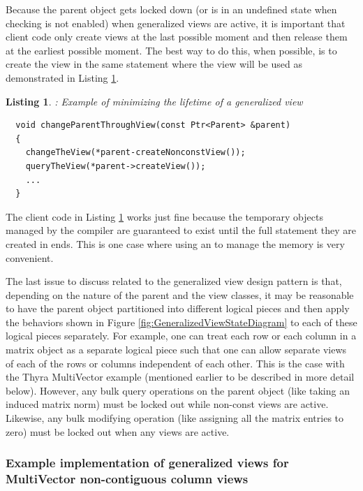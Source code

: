 \documentclass[pdf,ps2pdf,11pt]{SANDreport}
\newtheorem{listing}{Listing}
\begin{document}
Because the parent object gets locked down (or is in an undefined
state when checking is not enabled) when generalized views are active,
it is important that client code only create views at the last
possible moment and then release them at the earliest possible moment.
The best way to do this, when possible, is to create the view in the
same statement where the view will be used as demonstrated in Listing
{}\ref{listing:generalized-view-min-lifetime}.


\begin{listing}:  Example of minimizing the lifetime of a generalized
view  \\
\label{listing:generalized-view-min-lifetime}
{\small\begin{verbatim}
  void changeParentThroughView(const Ptr<Parent> &parent)
  {
    changeTheView(*parent-createNonconstView());
    queryTheView(*parent->createView());
    ...
  }
\end{verbatim}}
\end{listing}


The client code in Listing
{}\ref{listing:generalized-view-min-lifetime} works just fine because
the temporary {} objects managed by the
compiler are guaranteed to exist until the full statement they are
created in ends.  This is one case where using an {} to
manage the memory is very convenient.

The last issue to discuss related to the generalized view design
pattern is that, depending on the nature of the parent and the view
classes, it may be reasonable to have the parent object partitioned
into different logical pieces and then apply the behaviors shown in
Figure {}\ref{fig:GeneralizedViewStateDiagram} to each of these
logical pieces separately.  For example, one can treat each row or
each column in a matrix object as a separate logical piece such that
one can allow separate views of each of the rows or columns
independent of each other.  This is the case with the Thyra
MultiVector example (mentioned earlier to be described in more detail
below).  However, any bulk query operations on the parent object (like
taking an induced matrix norm) must be locked out while non-const
views are active.  Likewise, any bulk modifying operation (like
assigning all the matrix entries to zero) must be locked out when any
views are active.


%
{}\subsubsection*{Example implementation of generalized views for
MultiVector non-contiguous column views}
%
\end{document}
